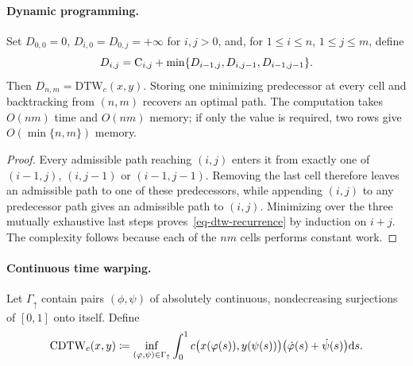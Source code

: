 \paragraph{Dynamic programming.}
\begin{prop}\label{prop-dtw-dynamic-programming}
Set $D_{0,0}=0$, $D_{i,0}=D_{0,j}=+\infty$ for $i,j>0$, and, for $1\leq i\leq n$, $1\leq j\leq m$, define
\begin{equation}\label{eq-dtw-recurrence}
D_{i,j}
=
\mathrm{C}_{i,j}+\min\{D_{i-1,j},D_{i,j-1},D_{i-1,j-1}\}.
\end{equation}
Then $D_{n,m}=\mathrm{DTW}_c(x,y)$. Storing one minimizing predecessor at every cell and backtracking from $(n,m)$ recovers an optimal path. The computation takes $O(nm)$ time and $O(nm)$ memory; if only the value is required, two rows give $O(\min\{n,m\})$ memory.
\end{prop}
\begin{proof}
Every admissible path reaching $(i,j)$ enters it from exactly one of $(i-1,j)$, $(i,j-1)$ or $(i-1,j-1)$. Removing the last cell therefore leaves an admissible path to one of these predecessors, while appending $(i,j)$ to any predecessor path gives an admissible path to $(i,j)$. Minimizing over the three mutually exhaustive last steps proves~\eqref{eq-dtw-recurrence} by induction on $i+j$. The complexity follows because each of the $nm$ cells performs constant work.
\end{proof}
\paragraph{Continuous time warping.}
\begin{defn}\label{def-continuous-dtw}
Let $\Gamma_\uparrow$ contain pairs $(\phi,\psi)$ of absolutely continuous, nondecreasing surjections of $[0,1]$ onto itself. Define
\begin{equation}\label{eq-continuous-dtw}
\mathrm{CDTW}_c(x,y)
\coloneqq
\inf_{(\varphi,\psi)\in\Gamma_\uparrow}
\int_0^1
c\bigl(x(\varphi(s)),y(\psi(s))\bigr)
\bigl(\dot{\varphi}(s)+\dot\psi(s)\bigr)\mathrm{d} s.
\end{equation}
\end{defn}
